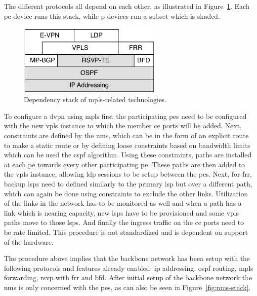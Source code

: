 The different protocols all depend on each other, as illustrated in Figure~\ref{fig:mpls-stack}. Each \ac{pe} device runs this stack, while \ac{p} devices run a subset which is shaded. 

\begin{figure}[!h]
	\centering
	\includegraphics[width=7cm]{./includes/mpls-stack.pdf}
	\caption{Dependency stack of \ac{mpls}-related technologies.}
	\label{fig:mpls-stack}
\end{figure} 

To configure a \ac{dvpn} using \ac{mpls} first the participating \acp{pe} need to be configured with the new \ac{vpls} instance to which the member \ac{ce} ports will be added. Next, constraints are defined by the \ac{nms}, which can be in the form of an explicit route to make a static route or by defining loose constraints based on bandwidth limits which can be used the \ac{cspf} algorithm. Using these constraints, paths are installed at each \ac{pe} towards every other participating \ac{pe}. These paths are then added to the \ac{vpls} instance, allowing \ac{ldp} sessions to be setup between the \acp{pe}. Next, for \ac{frr}, backup \acp{lsp} need to defined similarly to the primary \ac{lsp} but over a different path, which can again be done using constraints to exclude the other links. Utilization of the links in the network has to be monitored as well and when a path has a link which is nearing capacity, new \acp{lsp} have to be provisioned and some \ac{vpls} paths move to those \acp{lsp}. And finally the ingress traffic on the \ac{ce} ports need to be rate limited. This procedure is not standardized and is dependent on support of the hardware.

The procedure above implies that the backbone network has been setup with the following protocols and features already enabled: \ac{ip} addressing, \ac{ospf} routing, \ac{mpls} forwarding, \ac{rsvp} with \ac{frr} and \ac{bfd}. After initial setup of the backbone network the \ac{nms} is only concerned with the \acp{pe}, as can also be seen in Figure~\ref{fig:nms-stack}.


